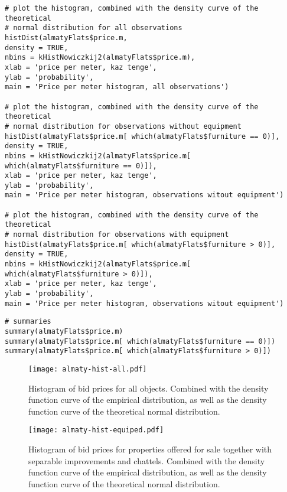 \documentclass[]{scrreprt}
\begin{document}
%
\begin{lstlisting}[float=htp, caption = Plotting histograms for observations of different types, firstnumber=1, label= lst:plot-hist-R]
# plot the histogram, combined with the density curve of the theoretical
# normal distribution for all observations
histDist(almatyFlats$price.m,
density = TRUE,
nbins = kHistNowiczkij2(almatyFlats$price.m),
xlab = 'price per meter, kaz tenge',
ylab = 'probability',
main = 'Price per meter histogram, all observations')

# plot the histogram, combined with the density curve of the theoretical
# normal distribution for observations without equipment
histDist(almatyFlats$price.m[ which(almatyFlats$furniture == 0)],
density = TRUE,
nbins = kHistNowiczkij2(almatyFlats$price.m[ which(almatyFlats$furniture == 0)]),
xlab = 'price per meter, kaz tenge',
ylab = 'probability',
main = 'Price per meter histogram, observations witout equipment')

# plot the histogram, combined with the density curve of the theoretical
# normal distribution for observations with equipment
histDist(almatyFlats$price.m[ which(almatyFlats$furniture > 0)],
density = TRUE,
nbins = kHistNowiczkij2(almatyFlats$price.m[ which(almatyFlats$furniture > 0)]),
xlab = 'price per meter, kaz tenge',
ylab = 'probability',
main = 'Price per meter histogram, observations witout equipment')
\end{lstlisting}
%
\begin{lstlisting}[float=htp, caption = Calculation of basic descriptive statistics for observations of different types, firstnumber=1, label= lst:summaries-R]
# summaries
summary(almatyFlats$price.m)
summary(almatyFlats$price.m[ which(almatyFlats$furniture == 0)])
summary(almatyFlats$price.m[ which(almatyFlats$furniture > 0)])
\end{lstlisting}
%
\begin{figure}[htp]
	\centering
	\texttt{[image: almaty-hist-all.pdf]}
	\caption{Histogram of bid prices for all objects. Combined with the density function curve of the empirical distribution, as well as the density function curve of the theoretical normal distribution.}
	\label{fig:almaty-hist-all-r}
\end{figure}
%
%
\begin{figure}[htp]
	\centering
	\texttt{[image: almaty-hist-equiped.pdf]}
	\caption{Histogram of bid prices for properties offered for sale together with separable improvements and chattels. Combined with the density function curve of the empirical distribution, as well as the density function curve of the theoretical normal distribution.}
	\label{fig:almaty-hist-equiped-r}
\end{figure}
\end{document}
